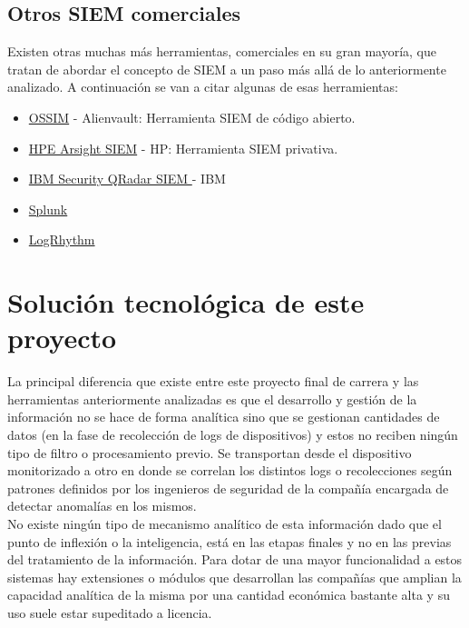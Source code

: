 \subsection{Otros SIEM comerciales}

Existen otras muchas más herramientas, comerciales en su gran mayoría, que tratan de abordar el concepto de SIEM a un paso más allá de lo anteriormente analizado. A continuación se van a citar algunas de esas herramientas:

\begin{itemize}
\item \href{https://www.alienvault.com/products/ossim}{OSSIM} - Alienvault: Herramienta SIEM de código abierto.
\item \href{http://www8.hp.com/es/es/software-solutions/siem-security-information-event-management/}{HPE Arsight SIEM} - HP: Herramienta SIEM privativa.
\item \href{http://www-03.ibm.com/software/products/es/qradar-siem}{IBM Security QRadar SIEM } - IBM
\item \href{http://www.splunk.com/es\_es}{Splunk}
\item \href{https://logrhythm.com/es/}{LogRhythm}
\end{itemize}

\section{Solución tecnológica de este proyecto}

La principal diferencia que existe entre este proyecto final de carrera y las herramientas anteriormente analizadas es que el desarrollo y gestión de la información no se hace de forma analítica sino que se gestionan cantidades de datos (en la fase de recolección de logs de dispositivos) y estos no reciben ningún tipo de filtro o procesamiento previo. Se transportan desde el dispositivo monitorizado a otro en donde se correlan los distintos logs o recolecciones según patrones definidos por los ingenieros de seguridad de la compañía encargada de detectar anomalías en los mismos. \\

No existe ningún tipo de mecanismo analítico de esta información dado que el punto de inflexión o la inteligencia, está en las etapas finales y no en las previas del tratamiento de la información. Para dotar de una mayor funcionalidad a estos sistemas hay extensiones o módulos que desarrollan las compañías que amplian la capacidad analítica de la misma por una cantidad económica bastante alta y su uso suele estar supeditado a licencia. \\

